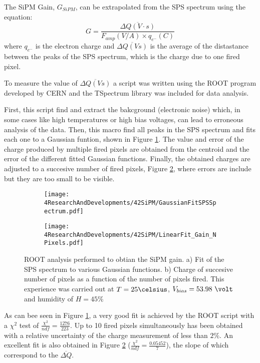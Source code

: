 The SiPM Gain, $G_{SiPM}$, can be extrapolated from the SPS spectrum using the equation:
\begin{equation}
G=\frac{\overline{\Delta Q (V \cdot{} s)}}{F_{amp}(V/A) \times q_{e^-}(C)}
\label{SiPMGain}
\end{equation}
where $q_{e^-}$ is the electron charge and $\overline{\Delta Q (Vs)}$ is the average of the distastance between the peaks of the SPS spectrum, which is the charge due to one fired pixel. 

To measure the value of $\overline{\Delta Q (Vs)}$ a script was written using the ROOT program \cite{ROOTWebPage} developed by CERN and the TSpectrum library was included for data analysis. 

First, this script find and extract the bakcground (electronic noise) which, in some cases like high temperatures or high bias voltages, can lead to erroneous analysis of the data. Then, this macro find all peaks in the SPS spectrum and fits each one to a Gaussian funtion, shown in Figure \ref{subfig:GaussianFitSiPMs}. The value and error of the charge produced by multiple fired pixels are obtained from the centroid and the error of the different fitted Gaussian functions. Finally, the obtained charges are adjusted to a succesive number of fired pixels, Figure \ref{subfig:LinearFitSiPMGain}, where errors are include but they are too small to be visible.

\begin{figure}
\centering
    \begin{subfigure}[b]{0.5\textwidth}
    \centering
    \texttt{[image: 4ResearchAndDevelopments/42SiPM/GaussianFitSPSSpectrum.pdf]}  
    \caption{\label{subfig:GaussianFitSiPMs}}
    \end{subfigure}
    \hfill
    \begin{subfigure}[b]{0.45\textwidth}
    \centering
    \texttt{[image: 4ResearchAndDevelopments/42SiPM/LinearFit\_Gain\_NPixels.pdf]}  
    \caption{\label{subfig:LinearFitSiPMGain}}
    \end{subfigure}
 \caption{ROOT analysis performed to obtian the SiPM gain. a) Fit of the SPS spectrum to various Gaussian functions. b) Charge of succesive number of pixels as a function of the number of pixels fired. This experience was carried out at $T=25\celsius$, $V_{bias}=53.98~\volt$ and humidity of $H=45\%$}
 \label{fig:ROOTAnalysisSiPMGain}
\end{figure}

As can bee seen in Figure \ref{subfig:GaussianFitSiPMs}, a very good fit is achieved by the ROOT script with a $\chi^2$ test of $\frac{\chi^2}{ndf}=\frac{1276}{223}$. Up to 10 fired pixels simultaneously has been obtained with a relative uncertainty of the charge measurement of less than $2\%$. An excellent fit is also obtained in Figure \ref{subfig:LinearFitSiPMGain} ($\frac{\chi^2}{ndf}=\frac{0.05452}{7}$), the slope of which correspond to the $\overline{\Delta Q}$.

